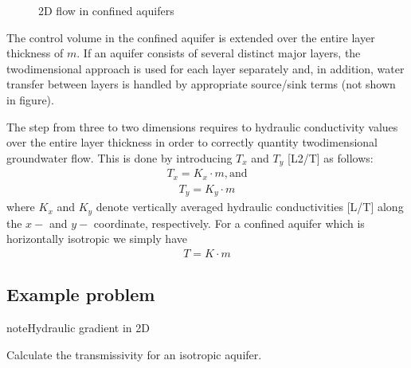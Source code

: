 \documentclass[letterpaper,10pt,english]{jupyterBook}
\begin{document}
\begin{figure}[htbp]
\centering
\capstart

\noindent{}
\caption{2D\sphinxhyphen{} flow in confined aquifers}\label{\detokenize{content/flow/L7/17_quantify_flow:d-confined}}\end{figure}

\sphinxAtStartPar
The control volume in the confined aquifer is extended over the entire layer thickness of \(m\). If an aquifer consists of several distinct major layers, the two\sphinxhyphen{}dimensional approach is used for each layer separately and, in addition, water transfer between layers is handled by appropriate source/sink terms (not shown in figure).

\sphinxAtStartPar
The step from three to two dimensions requires to  hydraulic conductivity values over the entire layer thickness in order to correctly quantity two\sphinxhyphen{}dimensional groundwater flow. This is done by introducing  \(T_x\) and \(T_y\) {[}L2/T{]} as follows:
\begin{equation*}
\begin{split}
T_x = K_x\cdot m, \text{and}
\end{split}
\end{equation*}\begin{equation*}
\begin{split}
T_y = K_y\cdot m
\end{split}
\end{equation*}
\sphinxAtStartPar
where \(K_x\) and \(K_y\) denote vertically averaged hydraulic conductivities {[}L/T{]} along the \(x-\) and \(y-\) coordinate, respectively. For a confined aquifer which is horizontally isotropic we simply have
\begin{equation*}
\begin{split}
T = K\cdot m
\end{split}
\end{equation*}

\subsection{Example problem}
\label{\detokenize{content/flow/L7/17_quantify_flow:example-problem}}
\begin{sphinxadmonition}{note}{Hydraulic gradient in 2D}

\sphinxAtStartPar
Calculate the transmissivity for an isotropic  aquifer.
\end{sphinxadmonition}
\end{document}
